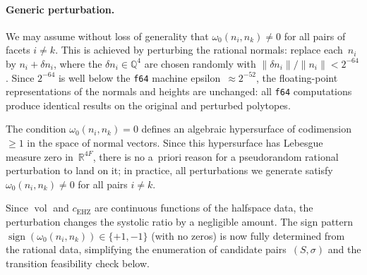 
\paragraph{Generic perturbation.}
We may assume without loss of generality that
$\omega_0(n_i, n_k) \neq 0$ for all pairs of facets $i \neq k$.
This is achieved by perturbing the rational normals:
replace each~$n_i$ by $n_i + \delta n_i$, where the
$\delta n_i \in \mathbb{Q}^4$ are chosen randomly with
$\|\delta n_i\| / \|n_i\| < 2^{-64}$.
Since $2^{-64}$ is well below the \texttt{f64} machine
epsilon~$\approx 2^{-52}$, the floating-point representations
of the normals and heights are unchanged:
all \texttt{f64} computations produce identical results
on the original and perturbed polytopes.

The condition $\omega_0(n_i, n_k) = 0$ defines an algebraic
hypersurface of codimension~$\geq 1$ in the space of normal
vectors.
Since this hypersurface has Lebesgue measure zero
in~$\mathbb{R}^{4F}$, there is no a~priori reason for
a pseudorandom rational perturbation to land on it;
in practice, all perturbations we generate satisfy
$\omega_0(n_i, n_k) \neq 0$ for all pairs $i \neq k$.

Since $\operatorname{vol}$ and $c_{\mathrm{EHZ}}$ are continuous
functions of the halfspace data, the perturbation changes
the systolic ratio by a negligible amount.
The sign pattern
$\operatorname{sign}(\omega_0(n_i, n_k)) \in \{+1, -1\}$
(with no zeros) is now fully determined from the rational
data, simplifying the enumeration of candidate
pairs~$(S, \sigma)$ and the transition feasibility check below.


